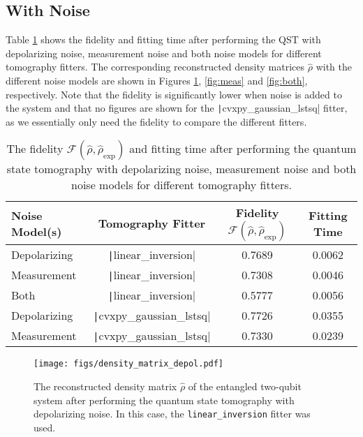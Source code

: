 \documentclass[a4paper,12pt]{article}
\begin{document}
\subsection{With Noise}
Table \ref{tab:noise} shows the fidelity and fitting time after performing the QST with depolarizing noise, measurement noise and both noise models for different tomography fitters. The corresponding reconstructed density matrices $\hat{\rho}$ with the different noise models are shown in Figures \ref{fig:depol}, \ref{fig:meas} and \ref{fig:both}, respectively. Note that the fidelity is significantly lower when noise is added to the system and that no figures are shown for the \texttt|cvxpy_gaussian_lstsq| fitter, as we essentially only need the fidelity to compare the different fitters.
\begin{table}[H]
    \centering
    \caption{The fidelity $\mathcal{F}(\hat{\rho}, \hat{\rho}_{\text{exp}})$ and fitting time after performing the quantum state tomography with depolarizing noise, measurement noise and both noise models for different tomography fitters.}
    \begin{tabular}{|l|c|c|c|}
        \toprule
        \textbf{Noise Model(s)} & \textbf{Tomography Fitter} & \textbf{Fidelity $\mathcal{F}(\hat{\rho}, \hat{\rho}_{\text{exp}})$} & \textbf{Fitting Time} \\
        \midrule
        Depolarizing & \texttt|linear_inversion| & 0.7689 & 0.0062 \\
        Measurement & \texttt|linear_inversion| & 0.7308 & 0.0046 \\
        Both & \texttt|linear_inversion| & 0.5777 & 0.0056 \\ \midrule
        Depolarizing & \texttt|cvxpy_gaussian_lstsq| & 0.7726 & 0.0355 \\
        Measurement & \texttt|cvxpy_gaussian_lstsq| & 0.7330 & 0.0239 \\ \bottomrule
    \end{tabular}
    \label{tab:noise}
\end{table}
\vspace{-1cm}
\begin{figure}[H]
    \centering
    \texttt{[image: figs/density\_matrix\_depol.pdf]}
    \caption{The reconstructed density matrix $\hat{\rho}$ of the entangled two-qubit system after performing the quantum state tomography with depolarizing noise. In this case, the \texttt{linear\_inversion} fitter was used.}
    \label{fig:depol}
\end{figure}
\end{document}
